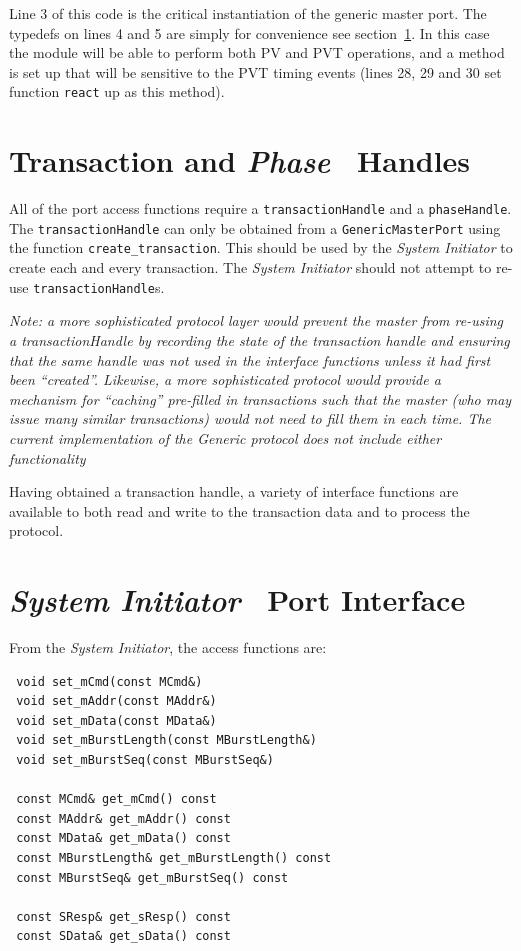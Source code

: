 \documentclass[12pt,oneside]{gsbook}
\newcommand{\master}{{\em System Initiator}\xspace}
\newcommand{\atom}{{\em Phase}\xspace}
\begin{document}
Line 3 of this code is the critical instantiation of the generic
master port. The typedefs on lines 4 and 5 are simply for
convenience see section~\ref{TRANSACTIONHANDLE}. In this case the module will be able to perform both PV
and PVT operations, and a method is set up that will be sensitive to
the PVT timing events (lines 28, 29 and 30 set function {\tt react} up
as this method).


\section{Transaction and \atom ~ Handles}
\label{TRANSACTIONHANDLE}
All of the port access functions require a {\tt transactionHandle} and
a {\tt phaseHandle}.\\
The {\tt transactionHandle} can only be obtained from a {\tt GenericMasterPort} using the function
{\tt create\_transaction}. This should be used by the \master to create each and
every transaction. The \master should not attempt to re-use {\tt transactionHandle}s.

{\em Note: a more sophisticated protocol layer would prevent the master from re-using a
transactionHandle by recording the state of the transaction handle and ensuring that the same handle was not used in the interface functions unless it had
first been ``created''. Likewise, a more sophisticated protocol would provide a mechanism for
``caching'' pre-filled in transactions such that the master (who may issue many similar
transactions) would not need to fill them in each time. The current implementation of the Generic
protocol does not include either functionality}

Having obtained a transaction handle, a variety of interface functions are available to both read
and write to the transaction data and to process the protocol.

\section{\master ~ Port Interface}

From the \master, the access functions are:

\begin{verbatim}
 void set_mCmd(const MCmd&) 
 void set_mAddr(const MAddr&) 
 void set_mData(const MData&) 
 void set_mBurstLength(const MBurstLength&) 
 void set_mBurstSeq(const MBurstSeq&) 

 const MCmd& get_mCmd() const 
 const MAddr& get_mAddr() const 
 const MData& get_mData() const 
 const MBurstLength& get_mBurstLength() const 
 const MBurstSeq& get_mBurstSeq() const 

 const SResp& get_sResp() const 
 const SData& get_sData() const 
\end{verbatim}
\end{document}
